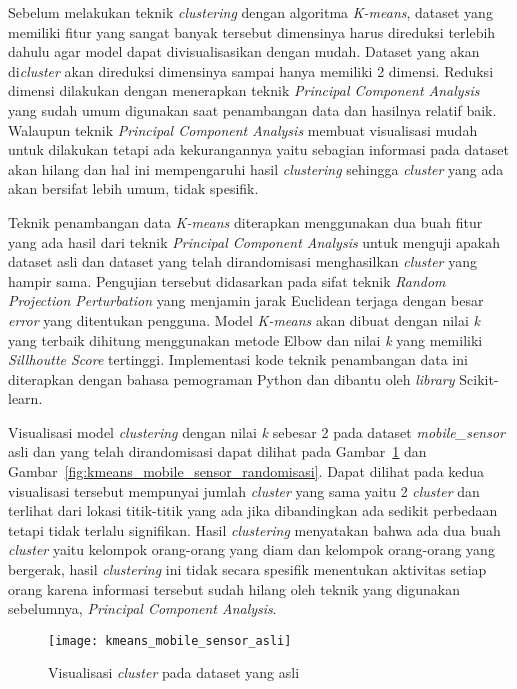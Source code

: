 Sebelum melakukan teknik \textit{clustering} dengan algoritma \textit{K-means}, dataset yang memiliki fitur yang sangat banyak tersebut dimensinya harus direduksi terlebih dahulu agar model dapat divisualisasikan dengan mudah. Dataset yang akan di\textit{cluster} akan direduksi dimensinya sampai hanya memiliki 2 dimensi. Reduksi dimensi dilakukan dengan menerapkan teknik \textit{Principal Component Analysis} yang sudah umum digunakan saat penambangan data dan hasilnya relatif baik. Walaupun teknik \textit{Principal Component Analysis} membuat visualisasi mudah untuk dilakukan tetapi ada kekurangannya yaitu sebagian informasi pada dataset akan hilang dan hal ini mempengaruhi hasil \textit{clustering} sehingga \textit{cluster} yang ada akan bersifat lebih umum, tidak spesifik. 

Teknik penambangan data \textit{K-means} diterapkan menggunakan dua buah fitur yang ada hasil dari teknik \textit{Principal Component Analysis} untuk menguji apakah dataset asli dan dataset yang telah dirandomisasi menghasilkan \textit{cluster} yang hampir sama. Pengujian tersebut didasarkan pada sifat teknik \textit{Random Projection Perturbation} yang menjamin jarak Euclidean terjaga dengan besar \textit{error} yang ditentukan pengguna. Model \textit{K-means} akan dibuat dengan nilai \textit{k} yang terbaik dihitung menggunakan metode Elbow dan nilai \textit{k} yang memiliki \textit{Sillhoutte Score} tertinggi. Implementasi kode teknik penambangan data ini diterapkan dengan bahasa pemograman Python dan dibantu oleh \textit{library} Scikit-learn. 

Visualisasi model \textit{clustering} dengan nilai \textit{k} sebesar 2 pada dataset \textit{mobile\_sensor} asli dan yang telah dirandomisasi dapat dilihat pada Gambar~\ref{fig:kmeans_mobile_sensor_asli} dan Gambar~\ref{fig:kmeans_mobile_sensor_randomisasi}. Dapat dilihat pada kedua visualisasi tersebut mempunyai jumlah \textit{cluster} yang sama yaitu 2 \textit{cluster} dan terlihat dari lokasi titik-titik yang ada jika dibandingkan ada sedikit perbedaan tetapi tidak terlalu signifikan. Hasil \textit{clustering} menyatakan bahwa ada dua buah \textit{cluster} yaitu kelompok orang-orang yang diam dan kelompok orang-orang yang bergerak, hasil \textit{clustering} ini tidak secara spesifik menentukan aktivitas setiap orang karena informasi tersebut sudah hilang oleh teknik yang digunakan sebelumnya, \textit{Principal Component Analysis}. 

\begin{figure}
	\centering
	\texttt{[image: kmeans\_mobile\_sensor\_asli]}
	\caption{Visualisasi \textit{cluster} pada dataset yang asli}
	\label{fig:kmeans_mobile_sensor_asli}
\end{figure}


